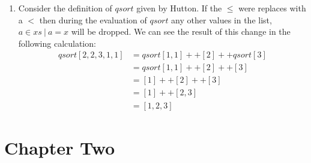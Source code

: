 \documentclass{article}
\begin{document}
\begin{enumerate}
\item Consider the definition of $qsort$ given by Hutton. If the $\leq$ were replaces with a $<$ then during the evaluation of $qsort$ any other values in the list, $a \in xs \ | \  a = x$ will be dropped. We can see the result of this change in the following calculation:
\begin{align*}
qsort [2,2,3,1,1] &= qsort [1, 1]++[2]++qsort[3]\\
&= qsort[1,1]++[2]++[3]\\
&= [1]++[2]++[3]\\
&= [1]++[2,3]\\
&=[1,2,3]
\end{align*}
\end{enumerate}

\section{Chapter Two}
\end{document}
